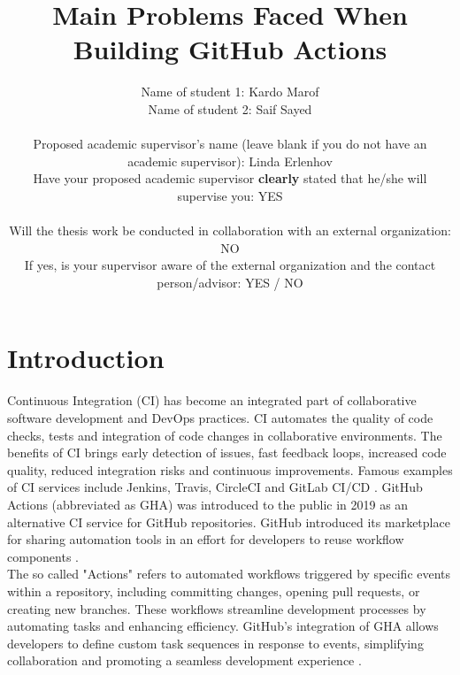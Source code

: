 \documentclass[conference]{IEEEtran}
\begin{document}
\title{Main Problems Faced When Building GitHub Actions\\
}

\author{
\begin{tabular}{@{}ll}
Name of student 1: Kardo Marof \\
Name of student 2: Saif Sayed \\
\\
Proposed academic supervisor's name (leave blank if you do not have an academic supervisor): Linda Erlenhov \\
Have your proposed academic supervisor \textbf{clearly} stated that he/she will supervise you: YES \\
\\
Will the thesis work be conducted in collaboration with an external organization: NO \\
If yes, is your supervisor aware of the external organization and the contact person/advisor: YES / NO
\end{tabular}
}

\maketitle

\section{Introduction}
    Continuous Integration (CI) has become an integrated part of collaborative software development and DevOps practices. CI automates the quality of code checks, tests and integration of code changes in collaborative environments. The benefits of CI brings early detection of issues, fast feedback loops, increased code quality, reduced integration risks and continuous improvements. Famous examples of CI services include Jenkins, Travis, CircleCI and GitLab CI/CD \cite{dabbish2012social}. GitHub Actions (abbreviated as GHA) was introduced to the public in 2019 as an alternative CI service for GitHub repositories. GitHub introduced its marketplace for sharing automation tools in an effort for developers to reuse workflow components \cite{saroar2023developers}. \\ 

    The so called "Actions" refers to automated workflows triggered by specific events within a repository, including committing changes, opening pull requests, or creating new branches. These workflows streamline development processes by automating tasks and enhancing efficiency. GitHub's integration of GHA allows developers to define custom task sequences in response to events, simplifying collaboration and promoting a seamless development experience \cite{chandrasekara2021getting}. \\
\end{document}
